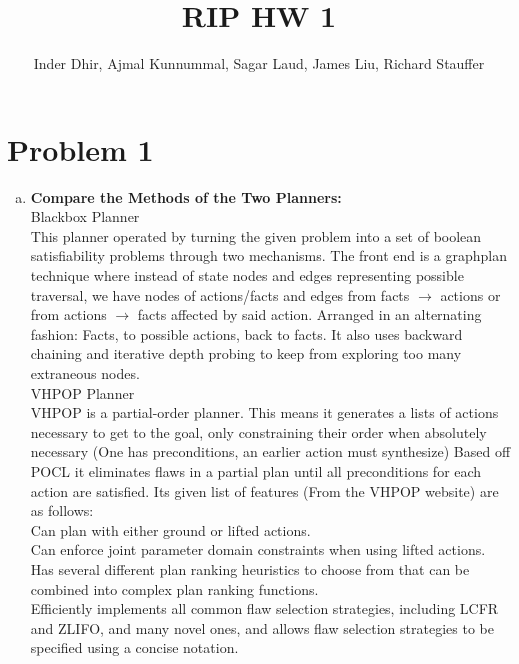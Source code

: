 \documentclass[]{article}
\title{RIP HW 1}
\author{Inder Dhir, Ajmal Kunnummal, Sagar Laud, James Liu, Richard Stauffer}
\begin{document}
\maketitle


\section{Problem 1}
	\begin{enumerate}[(a)]
	\item \textbf{Compare the Methods of the Two Planners:}\\
	Blackbox Planner\\
		This planner operated by turning the given problem into a set of boolean satisfiability problems through two mechanisms. The front end is a graphplan technique where instead of state nodes and edges representing possible traversal, we have nodes of actions/facts and edges from facts \(\rightarrow\) actions or from actions \(\rightarrow\) facts affected by said action. Arranged in an alternating fashion: Facts, to possible actions, back to facts. It also uses backward chaining and iterative depth probing to keep from exploring too many extraneous nodes. \\
	
	VHPOP Planner\\
		VHPOP is a partial-order planner. This means it generates a lists of actions necessary to get to the goal, only constraining their order when absolutely necessary (One has preconditions, an earlier action must synthesize) Based off POCL it eliminates flaws in a partial plan until all preconditions for each action are satisfied. Its given list of features (From the VHPOP website) are as follows:\\
		
		Can plan with either ground or lifted actions.\\
		
		 Can enforce joint parameter domain constraints when using lifted actions.\\
		 
		 Has several different plan ranking heuristics to choose from that can be combined into complex plan ranking functions.\\
		 
		 Efficiently implements all common flaw selection strategies, including LCFR and ZLIFO, and many novel ones, and allows flaw selection strategies to be specified using a concise notation.\\
		 

\end{enumerate}
\end{document}
